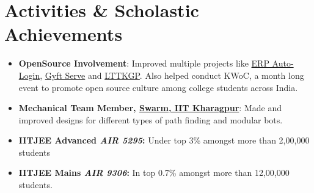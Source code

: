 \documentclass[letterpaper,11pt]{article}
\begin{document}
\section{Activities \& Scholastic Achievements}
\begin{itemize}[leftmargin=0.15in, label={}]
\item \textbf{OpenSource Involvement}: Improved multiple projects like {\href{https://github.com/metakgp/erp-auto-login}{ERP Auto-Login}}, {\href {https://github.com/metakgp/gyft-serve}{Gyft Serve}} and {\href{https://github.com/lttkgp}{LTTKGP}}. Also helped conduct KWoC, a month long event to promote open source culture among college students across India.

\item\textbf{Mechanical Team Member, {\href{https://iit-techambit.in}{Swarm, IIT Kharagpur}}}: Made and improved designs for different types of path finding and modular bots.

\item\textbf{IITJEE Advanced \emph{AIR 5295}:} Under top 3\% amongst more than 2,00,000 students 
\item\textbf{IITJEE Mains \emph{AIR 9306}:} In top 0.7\% amongst more than 12,00,000 students. 

\end{itemize}


\end{document}

